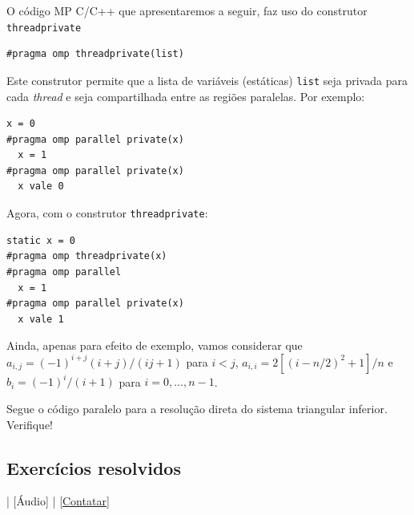 O código MP C/C++ que apresentaremos a seguir, faz uso do construtor \verb+threadprivate+
\begin{verbatim}
#pragma omp threadprivate(list)
\end{verbatim}
Este construtor permite que a lista de variáveis (estáticas) \verb+list+ seja privada para cada {\it thread} e seja compartilhada entre as regiões paralelas. Por exemplo:
\begin{verbatim}
x = 0
#pragma omp parallel private(x)
  x = 1
#pragma omp parallel private(x)
  x vale 0
\end{verbatim}
Agora, com o construtor \verb+threadprivate+:
\begin{verbatim}
static x = 0
#pragma omp threadprivate(x)
#pragma omp parallel
  x = 1
#pragma omp parallel private(x)
  x vale 1
\end{verbatim}

Ainda, apenas para efeito de exemplo, vamos considerar que $a_{i,j} = (-1)^{i+j}(i+j)/(ij+1)$ para $i<j$, $a_{i,i} = 2[(i-n/2)^2+1]/n$ e $b_i = (-1)^i/(i+1)$ para $i=0,\dotsc,n-1$.

Segue o código paralelo para a resolução direta do sistema triangular inferior. Verifique!



\subsection*{Exercícios resolvidos}

\begin{flushright}
  [Vídeo] | [Áudio] | \href{https://phkonzen.github.io/notas/contato.html}{[Contatar]}
\end{flushright}

